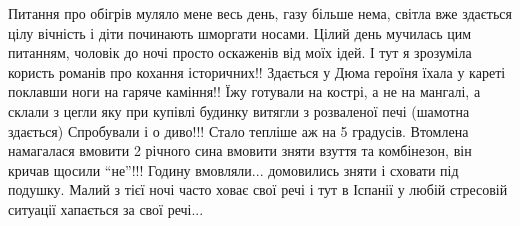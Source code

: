Питання про обігрів муляло мене весь день, газу більше нема, світла вже
здається цілу вічність і діти починають шморгати носами. Цілий день мучилась
цим питанням, чоловік до ночі просто оскаженів від моїх ідей. І тут я зрозуміла
користь романів про кохання історичних!! Здається у Дюма героїня їхала у кареті
поклавши ноги на гаряче каміння!! Їжу готували на кострі, а не на мангалі, а
склали з цегли яку при купівлі будинку витягли з розваленої печі (шамотна
здається) Спробували і о диво!!! Стало тепліше аж на 5 градусів. Втомлена
намагалася вмовити 2 річного сина вмовити зняти взуття та комбінезон, він
кричав щосили \enquote{не}!!! Годину вмовляли... домовились зняти і сховати під подушку.
Малий з тієї ночі часто ховає свої речі і тут в Іспанії у любій стресовій
ситуації хапається за свої речі...
